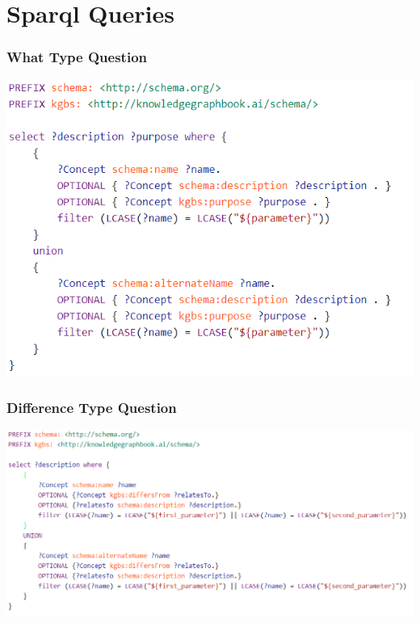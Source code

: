 \documentclass{beamer}
\begin{document}

\section{Sparql Queries}

\begin{frame}
\frametitle{What Type Question}
\begin{center}
\includegraphics[scale=0.5]{pictures/what_is_type_query.png}
\end{center}
\end{frame}

\begin{frame}
\frametitle{Difference Type Question}
\begin{center}
\includegraphics[scale=0.4]{pictures/difference_type_query.png}
\end{center}
\end{frame}
\end{document}
